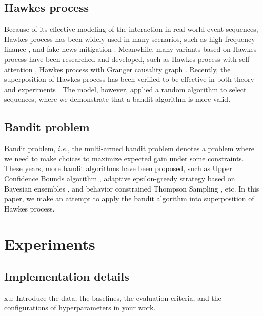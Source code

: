 \documentclass[runningheads]{llncs}
\newcommand{\xu}[1]{{\color{red} xu: #1}}
\begin{document}
\subsection{Hawkes process}

Because of its effective modeling of the interaction in real-world event sequences, Hawkes process has been widely used in many scenarios, such as high frequency finance \cite{bacry2015hawkes}, and fake news mitigation \cite{farajtabar2017fake}. Meanwhile, many variants based on Hawkes process have been researched and developed, such as Hawkes process with self-attention \cite{zhang2019self} \cite{zuo2020transformer}, Hawkes process with Granger causality graph \cite{xu2016learning}. Recently, the superposition of Hawkes process has been verified to be effective in both theory and experiments \cite{xu2018benefits}. The model, however, applied a random algorithm to select sequences, where we demonstrate that a bandit algorithm is more valid.



\subsection{Bandit problem}

Bandit problem, $i.e.$, the multi-armed bandit problem denotes a problem where we need to make choices to maximize expected gain under some constraints\cite{robbins1952some}. These years, more bandit algorithms have been proposed, such as Upper Confidence Bounds algorithm \cite{li2010contextual} \cite{chu2011contextual} \cite{bouneffouf2019optimal}, adaptive epsilon-greedy strategy based on Bayesian ensembles \cite{gimelfarb2020epsilon}, and behavior constrained Thompson Sampling \cite{balakrishnan2019incorporating}, etc.
In this paper, we make an attempt to apply the bandit algorithm into superposition of Hawkes process.


\section{Experiments}
\subsection{Implementation details}
\xu{Introduce the data, the baselines, the evaluation criteria, and the configurations of hyperparameters in your work.}
\end{document}
